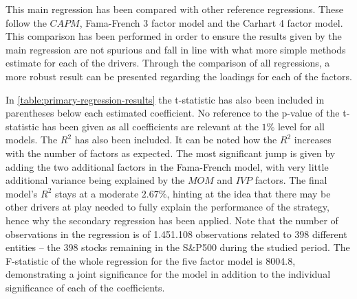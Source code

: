 This main regression has been compared with other reference regressions. These follow the $CAPM$, Fama-French 3 factor model and the Carhart 4 factor model. This comparison has been performed in order to ensure the results given by the main regression are not spurious and fall in line with what more simple methods estimate for each of the drivers. Through the comparison of all regressions, a more robust result can be presented regarding the loadings for each of the factors. 

In \autoref{table:primary-regression-results} the t-statistic has also been included in parentheses below each estimated coefficient. No reference to the p-value of the t-statistic has been given as all coefficients are relevant at the $1\%$ level for all models. The $R^2$ has also been included. It can be noted how the $R^2$ increases with the number of factors as expected. The most significant jump is given by adding the two additional factors in the Fama-French model, with very little additional variance being explained by the $MOM$ and $IVP$ factors. The final model's $R^2$ stays at a moderate $2.67\%$, hinting at the idea that there may be other drivers at play needed to fully explain the performance of the strategy, hence why the secondary regression has been applied. Note that the number of observations in the regression is of 1.451.108 observations related to 398 different entities -- the 398 stocks remaining in the S\&P500 during the studied period. The F-statistic of the whole regression for the five factor model is 8004.8, demonstrating a joint significance for the model in addition to the individual significance of each of the coefficients. 


